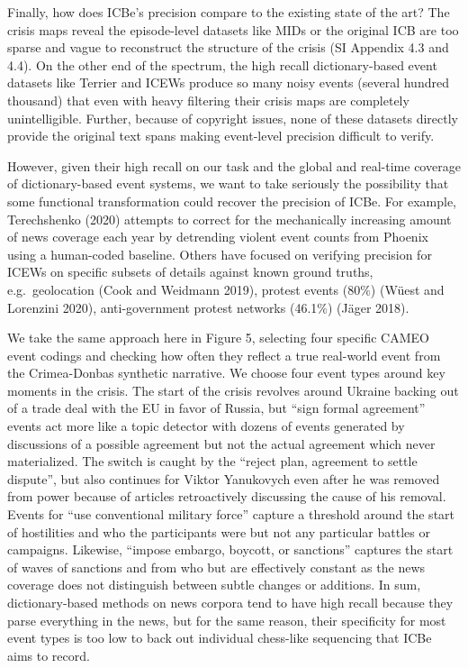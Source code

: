 \documentclass{article}
\begin{document}
Finally, how does ICBe's precision compare to the existing state of the
art? The crisis maps reveal the episode-level datasets like MIDs or the
original ICB are too sparse and vague to reconstruct the structure of
the crisis (SI Appendix 4.3 and 4.4). On the other end of the spectrum,
the high recall dictionary-based event datasets like Terrier and ICEWs
produce so many noisy events (several hundred thousand) that even with
heavy filtering their crisis maps are completely unintelligible.
Further, because of copyright issues, none of these datasets directly
provide the original text spans making event-level precision difficult
to verify.

However, given their high recall on our task and the global and
real-time coverage of dictionary-based event systems, we want to take
seriously the possibility that some functional transformation could
recover the precision of ICBe. For example, Terechshenko (2020) attempts
to correct for the mechanically increasing amount of news coverage each
year by detrending violent event counts from Phoenix using a human-coded
baseline. Others have focused on verifying precision for ICEWs on
specific subsets of details against known ground truths,
e.g.~geolocation (Cook and Weidmann 2019), protest events (80\%) (Wüest
and Lorenzini 2020), anti-government protest networks (46.1\%) (Jäger
2018).

We take the same approach here in Figure 5, selecting four specific
CAMEO event codings and checking how often they reflect a true
real-world event from the Crimea-Donbas synthetic narrative. We choose
four event types around key moments in the crisis. The start of the
crisis revolves around Ukraine backing out of a trade deal with the EU
in favor of Russia, but ``sign formal agreement'' events act more like a
topic detector with dozens of events generated by discussions of a
possible agreement but not the actual agreement which never
materialized. The switch is caught by the ``reject plan, agreement to
settle dispute'', but also continues for Viktor Yanukovych even after he
was removed from power because of articles retroactively discussing the
cause of his removal. Events for ``use conventional military force''
capture a threshold around the start of hostilities and who the
participants were but not any particular battles or campaigns. Likewise,
``impose embargo, boycott, or sanctions'' captures the start of waves of
sanctions and from who but are effectively constant as the news coverage
does not distinguish between subtle changes or additions. In sum,
dictionary-based methods on news corpora tend to have high recall
because they parse everything in the news, but for the same reason,
their specificity for most event types is too low to back out individual
chess-like sequencing that ICBe aims to record.
\end{document}

